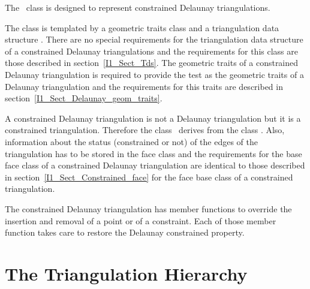 The \cgal\ class
is designed to represent
constrained Delaunay triangulations.

The class is templated by a geometric traits class 
and a triangulation data structure .
There are no special requirements for the triangulation data
structure
of a constrained Delaunay triangulations and the requirements
for this class are those described
in section~\ref{I1_Sect_Tds}. The geometric traits 
of a constrained Delaunay triangulation is required
to provide the  test as the geometric traits
of a Delaunay triangulation and the requirements for this traits
are described in section~\ref{I1_Sect_Delaunay_geom_traits}. 

A constrained Delaunay triangulation is not a Delaunay
triangulation but it is a constrained triangulation.
Therefore the class \ccClassTemplateName\ derives from
the class .
Also, information about the status (constrained or not)
of the edges of the triangulation has to be stored
in the face class
 and the requirements for the base face class
of a constrained Delaunay triangulation are 
identical to those described in 
section~\ref{I1_Sect_Constrained_face} for the face base class
of a constrained  triangulation.

The constrained Delaunay triangulation
has member functions to override the 
insertion and removal of a point or of a constraint.
Each of those member function takes care
to  restore
 the Delaunay constrained
property.

\section{The Triangulation Hierarchy}

